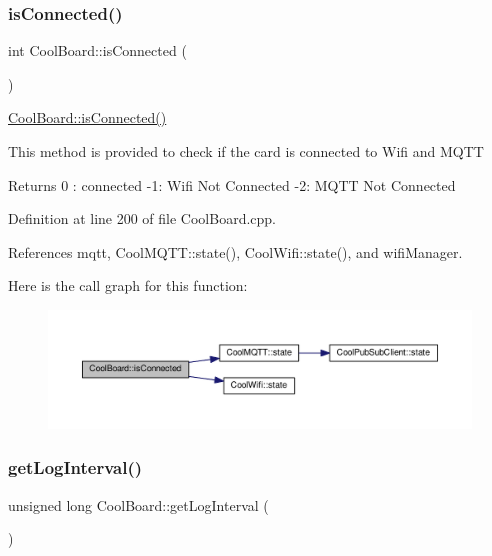 \subsubsection{\texorpdfstring{is\+Connected()}{isConnected()}}
{\footnotesize\ttfamily int Cool\+Board\+::is\+Connected (\begin{DoxyParamCaption}{ }\end{DoxyParamCaption})}

\hyperlink{class_cool_board_ad7442cf4b62c7b0d5bd62a0f75ffc065}{Cool\+Board\+::is\+Connected()}

This method is provided to check if the card is connected to Wifi and M\+Q\+TT

\begin{DoxyReturn}{Returns}
0 \+: connected -\/1\+: Wifi Not Connected -\/2\+: M\+Q\+TT Not Connected 
\end{DoxyReturn}


Definition at line 200 of file Cool\+Board.\+cpp.



References mqtt, Cool\+M\+Q\+T\+T\+::state(), Cool\+Wifi\+::state(), and wifi\+Manager.

Here is the call graph for this function\+:
\nopagebreak
\begin{figure}[H]
\begin{center}
\leavevmode
\includegraphics[width=350pt]{d7/df9/class_cool_board_ad7442cf4b62c7b0d5bd62a0f75ffc065_cgraph}
\end{center}
\end{figure}
\mbox{\label{class_cool_board_a7508e029f2ee17bb747ffab599285e0d}} 
\subsubsection{\texorpdfstring{get\+Log\+Interval()}{getLogInterval()}}
{\footnotesize\ttfamily unsigned long Cool\+Board\+::get\+Log\+Interval (\begin{DoxyParamCaption}{ }\end{DoxyParamCaption})}


